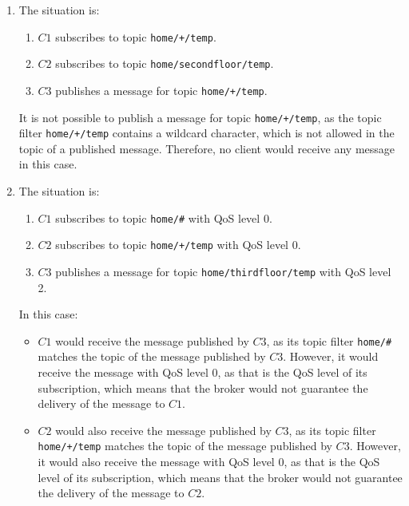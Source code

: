 \begin{ejercicio}
\begin{enumerate}[label=(\alph*)]
        In this case:
        \begin{itemize}
            \item $C1$ would receive the message published by $C4$, as its topic filter, which is \texttt{home/thirdfloor/+/temp}, matches the topic of the message published by $C4$.
            \item $C5$ would not receive any message, as the retain flag for the message published by $C4$ was set to ``0''.
        \end{itemize}
        \item The situation is:
        \begin{enumerate}[label=\arabic*)]
            \item $C1$ subscribes to topic \texttt{home/+/temp}.
            \item $C2$ subscribes to topic \texttt{home/secondfloor/temp}.
            \item $C3$ publishes a message for topic \texttt{home/+/temp}.
        \end{enumerate}

        It is not possible to publish a message for topic \texttt{home/+/temp}, as the topic filter \texttt{home/+/temp} contains a wildcard character, which is not allowed in the topic of a published message. Therefore, no client would receive any message in this case.
        
        \item The situation is:
        \begin{enumerate}[label=\arabic*)]
            \item $C1$ subscribes to topic \texttt{home/\#} with QoS level 0.
            \item $C2$ subscribes to topic \texttt{home/+/temp} with QoS level 0.
            \item $C3$ publishes a message for topic \texttt{home/thirdfloor/temp} with QoS level 2.
        \end{enumerate}

            In this case:
            \begin{itemize}
                \item $C1$ would receive the message published by $C3$, as its topic filter \texttt{home/\#} matches the topic of the message published by $C3$. However, it would receive the message with QoS level 0, as that is the QoS level of its subscription, which means that the broker would not guarantee the delivery of the message to $C1$.
                \item $C2$ would also receive the message published by $C3$, as its topic filter \texttt{home/+/temp} matches the topic of the message published by $C3$. However, it would also receive the message with QoS level 0, as that is the QoS level of its subscription, which means that the broker would not guarantee the delivery of the message to $C2$.
            \end{itemize}
        \end{enumerate}
\end{ejercicio}

